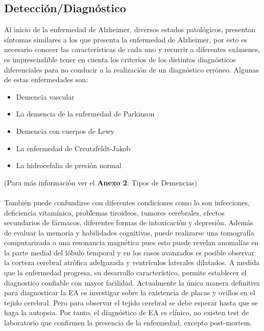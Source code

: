 \documentclass[smallextended, 12pt]{article}
\begin{document}
	\subsection{Detecci\'on/Diagn\'ostico}
	Al inicio de la enfermedad de Alzheimer, diversos estados patol\'ogicos, presentan s\'intomas similares a los que presenta la enfermedad de Alzheimer, por esto es necesario conocer las caracter\'isticas de cada uno y recurrir a diferentes ex\'amenes, es imprescindible tener en cuenta los criterios de los distintos diagn\'osticos diferenciales para no conducir a la realizaci\'on de un diagn\'ostico err\'oneo. Algunas de estas enfermedades son: \cite{ref6}
	\begin{itemize}
		\item Demencia vascular
		\item La demencia de la enfermedad de Parkinson
		\item Demencia con cuerpos de Lewy
		\item La enfermedad de Creutzfeldt-Jakob
		\item La hidrocefalia de presi\'on normal \cite{ref9} 
	\end{itemize} 
	(Para m\'as informaci\'on ver el \textbf{Anexo 2}: Tipos de Demencias) \cite{ref9}\\
	\\
	Tambi\'en puede confundirse con diferentes condiciones como lo son infecciones, deficiencia vitam\'inica, problemas tiroideos, tumores cerebrales, efectos secundarios de f\'armacos, diferentes formas de intoxicaci\'on y depresi\'on. Adem\'as de evaluar la memoria y habilidades cognitivas, puede realizarse una tomograf\'ia computarizada o una resonancia magn\'etica pues esto puede revelan anomal\'ias en la parte medial del l\'obulo temporal y en los casos avanzados es posible observar la corteza cerebral atr\'ofica adelgazada y ventr\'iculos laterales dilatados. A medida que la enfermedad progresa, su desarrollo caracter\'istico, permite establecer el diagnostico confiable con mayor facilidad. Actualmente la \'unica manera definitiva para diagnosticar la EA es investigar sobre la existencia de placas y ovillos en el tejido cerebral. Pero para observar el tejido cerebral se debe esperar hasta que se haga la autopsia. Por tanto, el diagn\'ostico de EA es cl\'inico, no existen test de laboratorio que confirmen la presencia de la enfermedad, excepto post-mortem. \cite{ref5} \cite{ref6} \cite{ref3}
\end{document}
